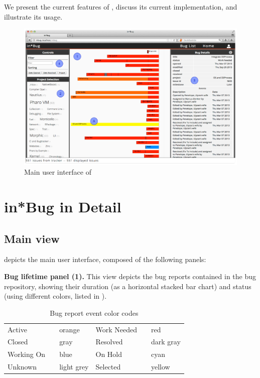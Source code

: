 We present the current features of \ib, discuss its current implementation, and illustrate its usage.


\begin{figure}[t]
\centering
\includegraphics[width=\linewidth]{Images/visualize/inbug-list.pdf}
\caption{Main user interface of \ib}
\label{inbug}
\end{figure}

\section{in*Bug in Detail}\label{sec:visualize-details}

\subsection{Main view}\label{main-view}

 depicts the main user interface, composed of the following panels:

\textbf{Bug lifetime panel (1).} \label{bug-lifetime-panel} This view depicts the bug reports contained in the bug repository, showing their duration (as a horizontal stacked bar chart) and status (using different colors, listed in ).

\begin{table}[ht]
\center
\caption{Bug report event color codes}
\label{tab-colors}
\begin{tabular}{l p{0.1cm} l | l p{0.1cm} l } \hline
Active & \cellcolor{active} & orange & Work Needed & \cellcolor{work needed} & red \\
Closed & \cellcolor{closed} & gray & Resolved & \cellcolor{resolved} & dark gray \\
Working On & \cellcolor{working on} & blue & On Hold & \cellcolor{on hold} & cyan \\
Unknown & \cellcolor{unknown} & light grey & Selected & \cellcolor{yellow} & yellow \\ \hline
\end{tabular}
\end{table}

